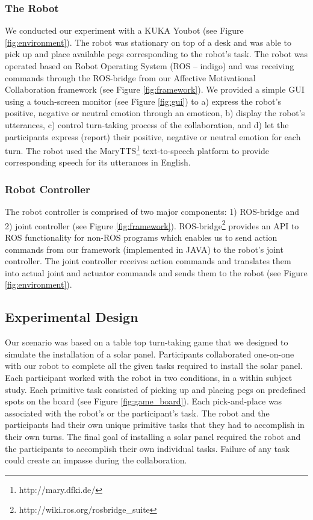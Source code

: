 \documentclass[12pt]{report}
\begin{document}
\subsubsection{The Robot}

We conducted our experiment with a KUKA Youbot (see Figure
\ref{fig:environment}). The robot was stationary on top of a desk and was able
to pick up and place available pegs corresponding to the robot's task. The robot
was operated based on Robot Operating System (ROS -- indigo) and was receiving
commands through the ROS-bridge from our Affective Motivational Collaboration
framework (see Figure \ref{fig:framework}). We provided a simple GUI using a
touch-screen monitor (see Figure \ref{fig:gui}) to a) express the robot's
positive, negative or neutral emotion through an emoticon, b) display the
robot's utterances, c) control turn-taking process of the collaboration, and d)
let the participants express (report) their positive, negative or neutral
emotion for each turn. The robot used the MaryTTS\footnote{http://mary.dfki.de/}
text-to-speech platform to provide corresponding speech for its utterances in
English.

\subsubsection{Robot Controller}
The robot controller is comprised of two major components: 1) ROS-bridge and 2)
joint controller (see Figure \ref{fig:framework}).
ROS-bridge\footnote{http://wiki.ros.org/rosbridge\_suite} provides an API to ROS
functionality for non-ROS programs which enables us to send action commands from
our framework (implemented in JAVA) to the robot's joint controller. The joint
controller receives action commands and translates them into actual joint and
actuator commands and sends them to the robot (see Figure \ref{fig:environment}).

\subsection{Experimental Design}

Our scenario was based on a table top turn-taking game that we designed to
simulate the installation of a solar panel. Participants collaborated one-on-one
with our robot to complete all the given tasks required to install the solar
panel. Each participant worked with the robot in two conditions, in a within
subject study. Each primitive task consisted of picking up and placing pegs on
predefined spots on the board (see Figure \ref{fig:game_board}). Each
pick-and-place was associated with the robot's or the participant's task. The
robot and the participants had their own unique primitive tasks that they had to
accomplish in their own turns. The final goal of installing a solar panel
required the robot and the participants to accomplish their own individual
tasks. Failure of any task could create an impasse during the collaboration.
\end{document}
